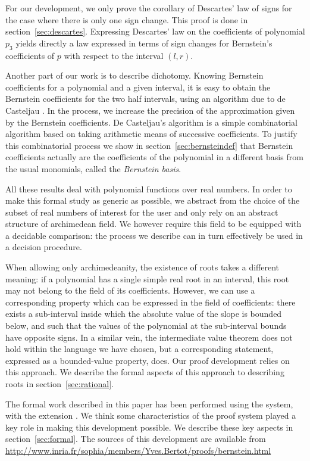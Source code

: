 \documentclass{mscs}
\begin{document}
For our development, we only prove the corollary  of
Descartes' law of signs for the case where there is only one sign
change.    This proof is done in section~\ref{sec:descartes}.
  Expressing Descartes' law on the coefficients of polynomial
\(p_3\) yields directly a law expressed in terms of sign changes for
Bernstein's coefficients of \(p\) with respect to the
interval
\((l,r)\).

Another part of our work is to describe dichotomy.  Knowing Bernstein
coefficients for a polynomial and a given interval, it is easy to
obtain the Bernstein coefficients for the two half intervals, using
an algorithm due to de Casteljau \cite{castel}.  In the process, we increase
the precision of the approximation given by the Bernstein
coefficients.  De Casteljau's algorithm is a simple combinatorial
algorithm based on taking arithmetic means of successive coefficients.
To justify this combinatorial process we show in
section~\ref{sec:bernsteindef} that Bernstein
coefficients actually are the coefficients of the polynomial in a
different basis from the usual monomials, called the {\em Bernstein basis}.

All these results deal with polynomial functions over real numbers. In
order to make this formal study as generic as possible, we abstract
from the choice of the subset of real numbers of interest for the
user and only rely on an abstract structure of archimedean field. We
however require this field to be equipped with a decidable comparison:
the process we describe can in turn effectively be used in a decision
procedure.

When allowing only archimedeanity,  the existence of roots takes a
different meaning: if a polynomial has a single simple real root in an
interval, this root may not belong to the field of its coefficients. 
However, we can use a corresponding property which can be expressed in
the field of coefficients: there exists a
sub-interval inside which the absolute value of the slope is bounded
below, and such that the values of the polynomial at the sub-interval
bounds have opposite signs.  In a similar vein, the intermediate value
theorem  does not hold within the language we have chosen, but a
corresponding statement, expressed as a bounded-value property, does.
Our proof development relies on this approach.  We describe the formal
aspects of this approach to describing roots in
section~\ref{sec:rational}.

The formal work described in this paper has been performed using
the \Coq{} system\cite{coqart, coqsite}, with the \ssr{} extension
\cite{GONTHIER:2008:INRIA-00258384:4}.  We think some characteristics
of the proof system played a key role in making this development
possible.  We describe these key aspects in section~\ref{sec:formal}.
The sources of this development are available from\\
{\url{http://www.inria.fr/sophia/members/Yves.Bertot/proofs/bernstein.html}}
\end{document}
